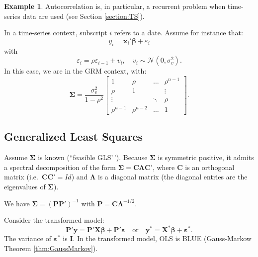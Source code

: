 \documentclass[
]{book}
\theoremstyle{definition}
\theoremstyle{definition}
\newtheorem{example}{Example}[chapter]
\theoremstyle{definition}
\theoremstyle{definition}
\theoremstyle{remark}
\begin{document}
\begin{example}
\protect\hypertarget{exm:autocorrelaaa}{}\label{exm:autocorrelaaa}Autocorrelation is, in particular, a recurrent problem when time-series data are used (see Section \ref{section:TS}).

In a time-series context, subscript \(i\) refers to a date. Assume for instance that:
\begin{equation}\label{eq:usual}
y_i = \mathbf{x}_i' \boldsymbol\beta + \varepsilon_i
\end{equation}
with
\begin{equation}\label{eq:usual2}
\varepsilon_i = \rho \varepsilon_{i-1} + v_i, \quad v_i \sim \mathcal{N}(0,\sigma_v^2).
\end{equation}
In this case, we are in the GRM context, with:
\begin{equation}\label{eq:SigmaAutocorrel}
\boldsymbol\Sigma =\frac{ \sigma_v^2}{1 - \rho^2} \left[    \begin{array}{cccc}
1 & \rho & \dots & \rho^{n-1} \\
\rho & 1 &  & \vdots \\
\vdots && \ddots& \rho \\
\rho^{n-1} & \rho^{n-2} & \dots & 1
\end{array} \right].
\end{equation}
\end{example}

\hypertarget{generalized-least-squares}{%
\subsection{Generalized Least Squares}\label{generalized-least-squares}}

Assume \(\boldsymbol\Sigma\) is known (``feasible GLS'\,'). Because \(\boldsymbol\Sigma\) is symmetric positive, it admits a spectral decomposition of the form \(\boldsymbol\Sigma = \mathbf{C} \boldsymbol\Lambda \mathbf{C}'\), where \(\mathbf{C}\) is an orthogonal matrix (i.e.~\(\mathbf{C}\mathbf{C}'=Id\)) and \(\boldsymbol\Lambda\) is a diagonal matrix (the diagonal entries are the eigenvalues of \(\boldsymbol\Sigma\)).

We have \(\boldsymbol\Sigma = (\mathbf{P}\mathbf{P}')^{-1}\) with \(\mathbf{P} = \mathbf{C}\boldsymbol\Lambda^{-1/2}\).

Consider the transformed model:
\[
\mathbf{P}'\mathbf{y} = \mathbf{P}'\mathbf{X}\boldsymbol\beta + \mathbf{P}'\boldsymbol\varepsilon \quad \mbox{or} \quad \mathbf{y}^* = \mathbf{X}^*\boldsymbol\beta + \boldsymbol\varepsilon^*.
\]
The variance of \(\boldsymbol\varepsilon^*\) is \(\mathbf{I}\). In the transformed model, OLS is BLUE (Gauss-Markow Theorem \ref{thm:GaussMarkov}).
\end{document}
